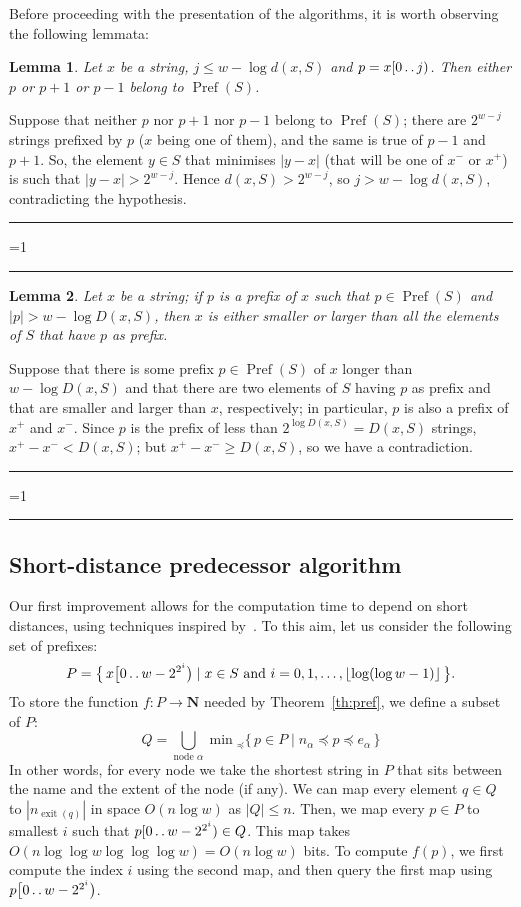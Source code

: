 \documentclass{article}
\newtheorem{lemma}{Lemma}
\newcounter{noqed}
\newcommand{\qed}{ \ifmmode\mbox{ }\fi\rule[-.05em]{.3em}{.7em}\setcounter{noqed}{0}}
\newenvironment{proof}[1][{}]{\noindent{\bf Proof#1. }\setcounter{noqed}{1}}{\ifnum\value{noqed}=1\qed\fi\par\medskip}
\newcommand{\exit}[1]{\operatorname{exit}(#1)}
\newcommand{\Pref}[1]{\operatorname{Pref}(#1)}
\newcommand{\N}{\mathbf N}
\newcommand{\?}{\mskip1.5mu}
\def\..{\,\mathpunct{\ldotp\ldotp}} %
\begin{document}
Before proceeding with the presentation of the algorithms, it is worth observing
the following lemmata:
\begin{lemma}
\label{lemma:hitpref}
	Let $x$ be a string, $j \leq w-\log d(x,S)$ and $p=x[0\..j)$. Then either $p$
	or $p+1$ or $p-1$ belong to $\Pref S$. 
\end{lemma}
\begin{proof}
Suppose that neither $p$ nor $p+1$ nor $p-1$ belong to $\Pref S$; there are
$2^{w-j}$ strings prefixed by $p$ ($x$ being one of them), and the same is true
of $p-1$ and $p+1$. So, the element $y \in S$ that minimises $|y-x|$ (that will be one
of $x^-$ or $x^+$) is such that $|y-x|>2^{w-j}$. Hence $d(x,S)>2^{w-j}$, so
$j>w-\log d(x,S)$, contradicting the hypothesis.\qed
\end{proof}
\begin{lemma}
\label{lemma:shortinprefs}
	Let $x$ be a string; if $p$ is a prefix of $x$ such that $p \in \Pref S$ and
	$|p|>w-\log D(x,S)$, then $x$ is either smaller or larger than all the
	elements of $S$ that have $p$ as prefix.
\end{lemma}
\begin{proof}
Suppose that there is some prefix $p\in \Pref S$ of $x$ longer than $w-\log
D(x,S)$ and that there are two elements of $S$ having $p$ as prefix and that
are smaller and larger than $x$, respectively; in particular, $p$ is also a
prefix of $x^+$ and $x^-$. Since $p$ is the prefix of less than $2^{\log D(x,S)}=D(x,S)$ strings, $x^+-x^-<D(x,S)$; but $x^+-x^-\geq D(x,S)$, so we have a contradiction.\qed
\end{proof}

\subsection{Short-distance predecessor algorithm}

Our first improvement allows for the computation time to depend on short
distances, using techniques inspired by~\cite{BDDFLSUBU}. To this aim, let us
consider the following set of prefixes:
\[
	P=\bigl\{\,x\bigl[0\..w-2^{2^i}\bigr) \mid x \in  S \text{ and }
	i=0,1,\dots,\lfloor\log(\log w - 1)\rfloor\,\bigr\}.
\]
To store the function $f:P\to \N$ needed by Theorem~\ref{th:pref}, we define a subset of $P$:
\[
Q=\bigcup_{\text{node $\alpha$}}\min{}_\preceq\{\,p\in P\mid n_\alpha\preceq p\preceq e_\alpha\,\}
\]
In other words, for every node we take the shortest string in $P$ that sits between the name and the extent
of the node (if any). We can map every element $q\in Q$ to $|n_{\exit q}|$ in space $O(n\log w)$ as $|Q|\leq n$.
Then, we map every $p\in P$ to smallest $i$ such that $p[0\..w-2^{2^i})\in Q$.
This map takes $O(n\log\log w\log\log\log w)=O(n\log w)$ bits. To compute $f(p)$, we first compute the index $i$ using 
the second map, and then query the first map using $p\bigl[0\..w-2^{2^i}\bigr)$. 
\end{document}
